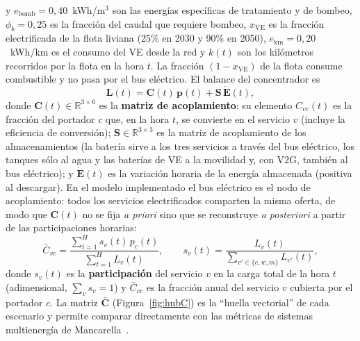 \documentclass[11pt,a4paper]{article}
\newcommand{\vect}[1]{\bm{#1}}
\begin{document}
y $e_{\mathrm{bomb}}=0{,}40$~kWh/m$^3$ son las energ\'ias espec\'ificas de tratamiento y de
bombeo, $\phi_b=0{,}25$ es la fracci\'on del caudal que requiere bombeo, $x_{\mathrm{VE}}$ es
la fracci\'on electrificada de la flota liviana (25\% en 2030 y 90\% en 2050), $e_{\mathrm{km}}=0{,}20$~kWh/km
es el consumo del VE desde la red y $k(t)$ son los kil\'ometros recorridos por la flota en
la hora $t$. La fracci\'on $(1-x_{\mathrm{VE}})$ de la flota consume combustible y no pasa
por el bus el\'ectrico. El balance del concentrador es
\begin{equation}
\vect{L}(t) = \vect{C}(t)\,\vect{p}(t) + \vect{S}\,\dot{\vect{E}}(t),
\label{eq:hub}
\end{equation}
donde $\vect{C}(t)\in\mathbb{R}^{3\times6}$ es la \textbf{matriz de acoplamiento}: su
elemento $C_{vc}(t)$ es la fracci\'on del portador $c$ que, en la hora $t$, se convierte
en el servicio $v$ (incluye la eficiencia de conversi\'on); $\vect{S}\in\mathbb{R}^{3\times3}$
es la matriz de acoplamiento de los almacenamientos (la bater\'ia sirve a los tres
servicios a trav\'es del bus el\'ectrico, los tanques s\'olo al agua y las bater\'ias de VE
a la movilidad y, con V2G, tambi\'en al bus el\'ectrico); y $\dot{\vect{E}}(t)$ es la
variaci\'on horaria de la energ\'ia almacenada (positiva al descargar). En el modelo
implementado el bus el\'ectrico es el nodo de acoplamiento: todos los servicios
electrificados comparten la misma oferta, de modo que $\vect{C}(t)$ no se fija
\emph{a priori} sino que se reconstruye \emph{a posteriori} a partir de las
participaciones horarias:
\begin{equation}
\bar{C}_{vc} = \frac{\sum_{t=1}^{H} s_v(t)\,p_c(t)}{\sum_{t=1}^{H} L_v(t)},\qquad
s_v(t) = \frac{L_v(t)}{\sum_{v'\in\{e,w,m\}} L_{v'}(t)},
\label{eq:Cbar}
\end{equation}
donde $s_v(t)$ es la \textbf{participaci\'on} del servicio $v$ en la carga total de la hora
$t$ (adimensional, $\sum_v s_v=1$) y $\bar{C}_{vc}$ es la fracci\'on anual del servicio $v$
cubierta por el portador $c$. La matriz $\bar{\vect{C}}$ (Figura~\ref{fig:hubC}) es la
``huella vectorial'' de cada escenario y permite comparar directamente con las m\'etricas
de sistemas multienerg\'ia de Mancarella~\cite{mancarella2014}.
\end{document}
